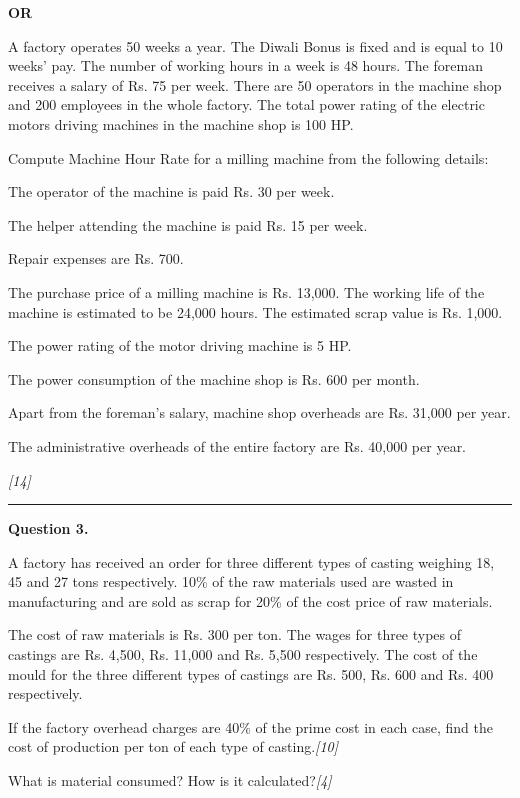 \documentclass[11pt,a4paper]{article}
\newcommand{\pts}[1]{\hfill   \textit{[#1]}}
\begin{document}
\centerline{   \textbf{OR}}

A factory operates 50 weeks a year. The Diwali Bonus is fixed and is equal to 10 weeks' pay. The number of working hours in a week is 48 hours. The foreman receives a salary of Rs. 75 per week. There are 50 operators in the machine shop and 200 employees in the whole factory. The total power rating of the electric motors driving machines in the machine shop is 100 HP.

Compute Machine Hour Rate for a milling machine from the following details:

\begin{parts}
  \item The operator of the machine is paid Rs. 30 per week.
  \item The helper attending the machine is paid Rs. 15 per week.
  \item Repair expenses are Rs. 700.
  \item The purchase price of a milling machine is Rs. 13,000. The working life of the machine is estimated to be 24,000 hours. The estimated scrap value is Rs. 1,000.
  \item The power rating of the motor driving machine is 5 HP.
  \item The power consumption of the machine shop is Rs. 600 per month.
  \item Apart from the foreman's salary, machine shop overheads are Rs. 31,000 per year.
  \item The administrative overheads of the entire factory are Rs. 40,000 per year.
\end{parts}\pts{14}

\medskip\rule{\linewidth}{0.2pt}




\noindent   \textbf{Question 3.}

\begin{parts}
  \item A factory has received an order for three different types of casting weighing 18, 45 and 27 tons respectively. 10\% of the raw materials used are wasted in manufacturing and are sold as scrap for 20\% of the cost price of raw materials.
  
  The cost of raw materials is Rs. 300 per ton. The wages for three types of castings are Rs. 4,500, Rs. 11,000 and Rs. 5,500 respectively. The cost of the mould for the three different types of castings are Rs. 500, Rs. 600 and Rs. 400 respectively.
  
  If the factory overhead charges are 40\% of the prime cost in each case, find the cost of production per ton of each type of casting.\pts{10}
  
  \item What is material consumed? How is it calculated?\pts{4}
\end{parts}
\end{document}
